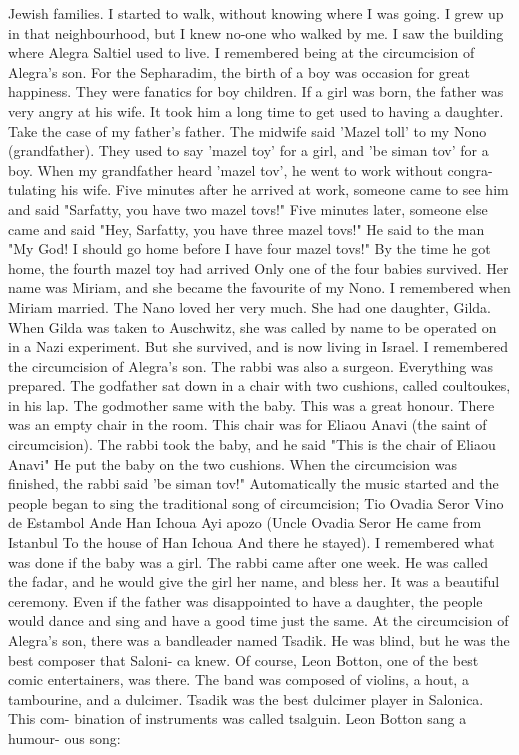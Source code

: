 Jewish families.
I started to walk, without knowing where I was going.
I grew up in 
that neighbourhood, but I knew no-one who walked by me.
I saw the building where Alegra Saltiel used to live.
I remembered being at the circumcision of Alegra's son.
For the Sepharadim, the birth of a boy was 
occasion for great happiness.
They were fanatics for boy children.
If 
a girl was born, the father was very angry at his wife.
It took him a 
long time to get used to having a daughter.
Take the case of my father's 
father.
The midwife said 'Mazel toll' to my Nono (grandfather).
They used to say 'mazel toy' for a girl, and 'be siman tov' for a boy.
When my grandfather heard 'mazel tov', he went to work without congra-
tulating his wife.
Five minutes after he arrived at work, someone came to see him and said "Sarfatty, you have two mazel tovs!"
Five minutes 
later, someone else came and said "Hey, Sarfatty, you have three mazel 
tovs!"
He said to the man "My God!
I should go home before I have four 
mazel tovs!"
By the time he got home, the fourth mazel toy had arrived 
Only one of the four babies survived.
Her name was Miriam, and she became the favourite of my Nono.
I remembered when Miriam married.
The 
Nano loved her very much.
She had one daughter, Gilda.
When Gilda was 
taken to Auschwitz, she was called by name to be operated on in a Nazi 
experiment.
But she survived, and is now living in Israel.
I remembered the circumcision of Alegra's son.
The rabbi was also
a surgeon.
Everything was prepared.
The godfather sat down in a chair 
with two cushions, called coultoukes, in his lap.
The godmother same 
with the baby.
This was a great honour.
There was an empty chair in 
the room.
This chair was for Eliaou Anavi (the saint of circumcision).
The rabbi took the baby, and he said "This is the chair of Eliaou Anavi" 
He put the baby on the two cushions.
When the circumcision was finished, the rabbi said 'be siman tov!"
Automatically the music started and
the people began to sing the traditional song of circumcision; 
Tio Ovadia Seror 
Vino de Estambol 
Ande Han Ichoua 
Ayi apozo 
(Uncle Ovadia Seror 
He came from Istanbul 
To the house of Han Ichoua 
And there he stayed).
I remembered what was done if the baby was a girl.
The rabbi came 
after one week.
He was called the fadar, and he would give the girl her 
name, and bless her.
It was a beautiful ceremony.
Even if the father  
was disappointed to have a daughter, the people would dance and sing and 
have a good time just the same.
At the circumcision of Alegra's son, there was a bandleader 
named Tsadik.
He was blind, but he was the best composer that Saloni-
ca knew.
Of course, Leon Botton, one of the best comic entertainers, 
was there.
The band was composed of violins, a hout, a tambourine, and 
a dulcimer.
Tsadik was the best dulcimer player in Salonica.
This com-
bination of instruments was called tsalguin.
Leon Botton sang a humour-
ous song: 

